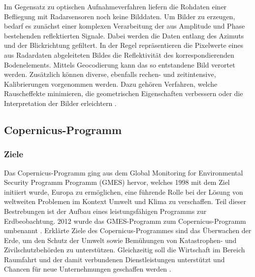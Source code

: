 Im Gegensatz zu optischen Aufnahmeverfahren liefern die Rohdaten 
einer Befliegung mit Radarsensoren noch keine Bilddaten. Um Bilder zu erzeugen, bedarf es zunächst einer komplexen Verarbeitung der aus Amplitude und Phase bestehenden 
reflektierten Signale. Dabei werden die Daten entlang des Azimuts und der Blickrichtung gefiltert. In der Regel repräsentieren die Pixelwerte eines aus Radardaten 
abgeleiteten Bildes die Reflektivität des korrespondierenden Bodenelements. Mittels Geocodierung kann das so entstandene Bild verortet werden. Zusätzlich können diverse,
ebenfalls rechen- und zeitintensive, Kalibrierungen vorgenommen werden. Dazu gehören Verfahren, welche Rauscheffekte minimieren, die geometrischen Eigenschaften verbessern 
oder die Interpretation der Bilder erleichtern \cite{tutorial_on_sar}.

\subsection{Copernicus-Programm}
\subsubsection{Ziele}
Das Copernicus-Programm ging aus dem Global Monitoring for Environmental Security Programm Programm (GMES) hervor, welches 1998 mit dem Ziel initiiert wurde, Europa 
zu ermöglichen, eine führende Rolle bei der Lösung von weltweiten Problemen im Kontext Umwelt und Klima zu verschaffen. Teil dieser Bestrebungen ist der Aufbau eines 
leistungsfähigen Programms zur Erdbeobachtung. 2012 wurde das GMES-Programm zum Copernicus-Programm umbenannt \cite{history_of_copernicus}.
Erklärte Ziele des Copernicus-Programmes sind das Überwachen der Erde, um den Schutz der Umwelt sowie Bemühungen von Katastrophen- und Zivilschutzbehörden zu 
unterstützen. Gleichzeitig soll die Wirtschaft im Bereich Raumfahrt und der damit verbundenen Dienstleistungen unterstützt und Chancen für neue Unternehmungen geschaffen
werden \cite{copernicus_regulation}.

